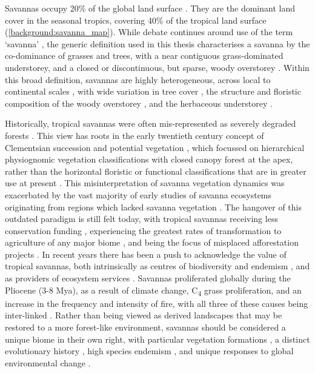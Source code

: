 \begin{refsection}
Savannas occupy \textapprox{}20\% of the global land surface \citep{Scholes1993}. They are the dominant land cover in the seasonal tropics, covering \textapprox{}40\% of the tropical land surface \citep{Scholes1997} (\autoref{background:savanna_map}). While debate continues around use of the term `savanna' \citep{Lehmann2011, Ratnam2011}, the generic definition used in this thesis characterises a savanna by the co-dominance of grasses and trees, with a near contiguous grass-dominated understorey, and a closed or discontinuous, but sparse, woody overstorey \citep{Scholes1997, Bond2008}. Within this broad definition, savannas are highly heterogeneous, across local to continental scales \citep{Bucini2007}, with wide variation in tree cover \citep{Sankaran2005, Hirota2011}, the structure and floristic composition of the woody overstorey \citep{Fayolle2018, Solbrig1996}, and the herbaceous understorey \citep{Siebert2019, Coller2018}.

Historically, tropical savannas were often mis-represented as severely degraded forests \citep{Veldman2016}. This view has roots in the early twentieth century concept of Clementsian succession and potential vegetation \citep{Clements1916, Pulsford2014}, which focussed on hierarchical physiognomic vegetation classifications with closed canopy forest at the apex, rather than the horizontal floristic or functional classifications that are in greater use at present \citep{Aleman2020}. This misinterpretation of savanna vegetation dynamics was exacerbated by the vast majority of early studies of savanna ecosystems originating from regions which lacked savanna vegetation \citep{Fairhead1996}. The hangover of this outdated paradigm is still felt today, with tropical savannas receiving less conservation funding \citep{Watson2016}, experiencing the greatest rates of transformation to agriculture of any major biome \citep{Hoekstra2004, Parr2014}, and being the focus of misplaced afforestation projects \citep{Silveira2020, Kumar2020, Laestadius2011}. In recent years there has been a push to acknowledge the value of tropical savannas, both intrinsically as centres of biodiversity and endemism \citep{Kumar2020, Pennington2018}, and as providers of ecosystem services \citep{Ryan2016}. Savannas proliferated globally during the Pliocene (\textapprox{}3-8 Mya), as a result of climate change, C\textsubscript{4} grass proliferation, and an increase in the frequency and intensity of fire, with all three of these causes being inter-linked \citep{Cerling1997, Beerling2006, Osborne2007, Edwards2010}. Rather than being viewed as derived landscapes that may be restored to a more forest-like environment, savannas should be considered a unique biome in their own right, with particular vegetation formations \citep{Torello2013}, a distinct evolutionary history \citep{Veldman2015}, high species endemism \citep{Pennington2006, Huntley1982}, and unique responses to global environmental change \citep{Sankaran2019}.


\end{refsection}
